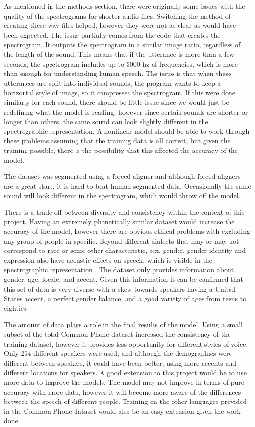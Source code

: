 \documentclass[10pt,twocolumn]{article}
\begin{document}
As mentioned in the methods section, there were originally some issues with the quality of the spectrograms for shorter audio files. Switching the method of creating these wav files helped, however they were not as clear as would have been expected. The issue partially comes from the code that creates the spectrogram. It outputs the spectrogram in a similar image ratio, regardless of the length of the sound. This means that if the utterance is more than a few seconds, the spectrogram includes up to 5000 hz of frequencies, which is more than enough for understanding human speech. The issue is that when these utterances are split into individual sounds, the program wants to keep a horizontal style of image, so it compresses the spectrogram. If this were done similarly for each sound, there should be little issue since we would just be redefining what the model is reading, however since certain sounds are shorter or longer than others, the same sound can look slightly different in the spectrographic representation. A nonlinear model should be able to work through these problems assuming that the training data is all correct, but given the training possible, there is the possibility that this affected the accuracy of the model. 



The dataset was segmented using a forced aligner and although forced aligners are a great start, it is hard to beat human-segmented data. Occasionally the same sound will look different in the spectrogram, which would throw off the model.




There is a trade off between diversity and consistency within the context of this project. Having an extremely phonetically similar dataset would increase the accuracy of the model, however there are obvious ethical problems with excluding any group of people in specific. Beyond different dialects that may or may not correspond to race or some other characteristic, sex, gender, gender identity and expression also have acoustic effects on speech, which is visible in the spectrographic representation \cite{PhoneticsSexGender}. The dataset only provides information about gender, age, locale, and accent. Given this information it can be confirmed that this set of data is very diverse with a skew towards speakers having a United States accent, a perfect gender balance, and a good variety of ages from teens to eighties. 

The amount of data plays a role in the final results of the model. Using a small subset of the total Common Phone dataset increased the consistency of the training dataset, however it provides less opportunity for different styles of voice. Only 264 different speakers were used, and although the demographics were different between speakers, it could have been better, using more accents and different locations for speakers. A good extension to this project would be to use more data to improve the models. The model may not improve in terms of pure accuracy with more data, however it will become more aware of the differences between the speech of different people. Training on the other languages provided in the Common Phone dataset would also be an easy extension given the work done.
\end{document}
